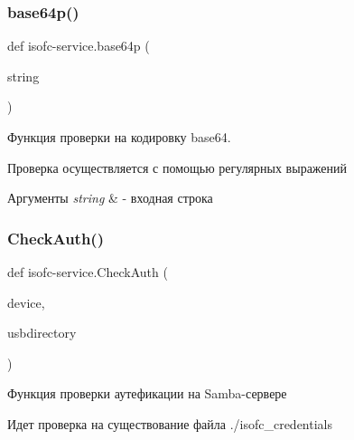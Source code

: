 \subsubsection{\texorpdfstring{base64p()}{base64p()}}
{\footnotesize\ttfamily def isofc-\/service.\+base64p (\begin{DoxyParamCaption}\item[{}]{string }\end{DoxyParamCaption})}



Функция проверки на кодировку base64. 

Проверка осуществляется с помощью регулярных выражений 
\begin{DoxyParams}{Аргументы}
{\em string} & -\/ входная строка \\
\hline
\end{DoxyParams}

\mbox{\label{isofc-service_8py_file_ae80f4771b0644a980f33148b21453267}} 
\subsubsection{\texorpdfstring{Check\+Auth()}{CheckAuth()}}
{\footnotesize\ttfamily def isofc-\/service.\+Check\+Auth (\begin{DoxyParamCaption}\item[{}]{device,  }\item[{}]{usbdirectory }\end{DoxyParamCaption})}



Функция проверки аутефикации на Samba-\/сервере 

Идет проверка на существование файла ./isofc\+\_\+credentials

